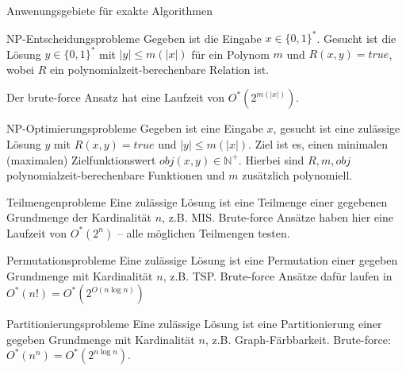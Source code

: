 \begin{section}{Anwenungsgebiete für exakte Algorithmen}
  \begin{subsection}{NP-Entscheidungsprobleme}
  Gegeben ist die Eingabe $x \in \{0,1\}^*$. Gesucht ist die Lösung $y \in \{0,1\}^*$ mit $|y| \leq m(|x|)$ für ein Polynom $m$ und $R(x,y) = true$, wobei $R$ ein polynomialzeit-berechenbare Relation ist.
  
  Der brute-force Ansatz hat eine Laufzeit von $O^* (2^{m(|x|)})$.
  \end{subsection}

  \begin{subsection}{NP-Optimierungsprobleme}
  Gegeben ist eine Eingabe $x$, gesucht ist eine zulässige Lösung $y$ mit $R(x,y) = true$ und $|y| \leq m(|x|)$. Ziel ist es, einen minimalen (maximalen) Zielfunktionswert $obj(x,y) \in \mathbb{N}^+$. Hierbei sind $R,m, obj$ polynomialzeit-berechenbare Funktionen und $m$ zusätzlich polynomiell.
  \end{subsection}
  
  \begin{subsection}{Teilmengenprobleme}
   Eine zulässige Lösung ist eine Teilmenge einer gegebenen Grundmenge der Kardinalität $n$, z.B. MIS. Brute-force Ansätze haben hier eine Laufzeit von $O^*(2^n)$ -- alle möglichen Teilmengen testen.
  \end{subsection}
  
  \begin{subsection}{Permutationsprobleme}
   Eine zulässige Lösung ist eine Permutation einer gegeben Grundmenge mit Kardinalität $n$, z.B. TSP. Brute-force Ansätze dafür laufen in $O^*(n!) = O^*(2^{O(n\log n)})$
  \end{subsection}
  
  \begin{subsection}{Partitionierungsprobleme}
   Eine zulässige Lösung ist eine Partitionierung einer gegeben Grundmenge mit Kardinalität $n$, z.B. Graph-Färbbarkeit. Brute-force: $O^*(n^n) = O^*(2^{n\log n})$.
  \end{subsection}
\end{section}

